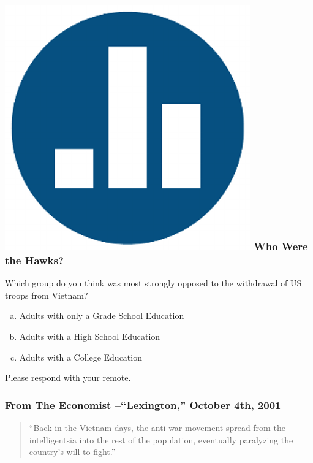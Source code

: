 \documentclass[handout]{beamer}
\begin{document}
\begin{frame}
\frametitle{\includegraphics[scale = 0.05]{./images/clicker} \hfill Who Were the Hawks?}
Which group do you think was most strongly \alert{opposed to} the withdrawal of US troops from Vietnam?
\begin{enumerate}[(a)]
	\item Adults with only a Grade School Education
	\item Adults with a High School Education
	\item Adults with a College Education
\end{enumerate}
\vspace{2em}
Please respond with your remote.

\end{frame}
\begin{frame}
\frametitle{From The Economist --``Lexington,'' October 4th, 2001}
\begin{quote}
 ``Back in the Vietnam days, the anti-war movement spread from the intelligentsia into the rest of the population, eventually paralyzing the country's will to fight.''
\end{quote}

\end{frame}

\end{document}
